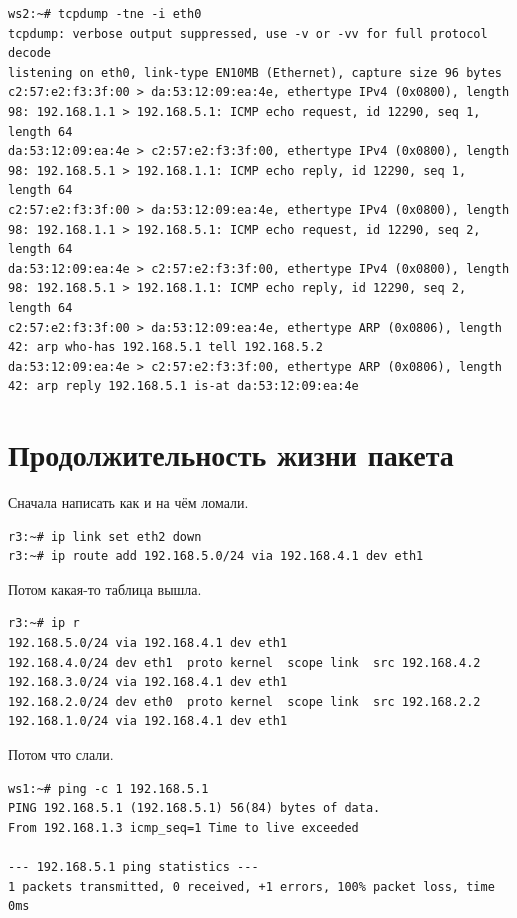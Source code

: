 \documentclass[a4paper,12pt]{article}
\begin{document}
\begin{Verbatim}
ws2:~# tcpdump -tne -i eth0
tcpdump: verbose output suppressed, use -v or -vv for full protocol decode
listening on eth0, link-type EN10MB (Ethernet), capture size 96 bytes
c2:57:e2:f3:3f:00 > da:53:12:09:ea:4e, ethertype IPv4 (0x0800), length 98: 192.168.1.1 > 192.168.5.1: ICMP echo request, id 12290, seq 1, length 64
da:53:12:09:ea:4e > c2:57:e2:f3:3f:00, ethertype IPv4 (0x0800), length 98: 192.168.5.1 > 192.168.1.1: ICMP echo reply, id 12290, seq 1, length 64
c2:57:e2:f3:3f:00 > da:53:12:09:ea:4e, ethertype IPv4 (0x0800), length 98: 192.168.1.1 > 192.168.5.1: ICMP echo request, id 12290, seq 2, length 64
da:53:12:09:ea:4e > c2:57:e2:f3:3f:00, ethertype IPv4 (0x0800), length 98: 192.168.5.1 > 192.168.1.1: ICMP echo reply, id 12290, seq 2, length 64
c2:57:e2:f3:3f:00 > da:53:12:09:ea:4e, ethertype ARP (0x0806), length 42: arp who-has 192.168.5.1 tell 192.168.5.2
da:53:12:09:ea:4e > c2:57:e2:f3:3f:00, ethertype ARP (0x0806), length 42: arp reply 192.168.5.1 is-at da:53:12:09:ea:4e
\end{Verbatim}


\section{Продолжительность жизни пакета}

Сначала написать как и на чём ломали. 

\begin{Verbatim}
r3:~# ip link set eth2 down
r3:~# ip route add 192.168.5.0/24 via 192.168.4.1 dev eth1
\end{Verbatim}

Потом какая-то таблица вышла.

\begin{Verbatim}
r3:~# ip r
192.168.5.0/24 via 192.168.4.1 dev eth1 
192.168.4.0/24 dev eth1  proto kernel  scope link  src 192.168.4.2 
192.168.3.0/24 via 192.168.4.1 dev eth1 
192.168.2.0/24 dev eth0  proto kernel  scope link  src 192.168.2.2 
192.168.1.0/24 via 192.168.4.1 dev eth1 
\end{Verbatim}

Потом что слали.

\begin{Verbatim}
ws1:~# ping -c 1 192.168.5.1
PING 192.168.5.1 (192.168.5.1) 56(84) bytes of data.
From 192.168.1.3 icmp_seq=1 Time to live exceeded

--- 192.168.5.1 ping statistics ---
1 packets transmitted, 0 received, +1 errors, 100% packet loss, time 0ms
\end{Verbatim}
\end{document}
